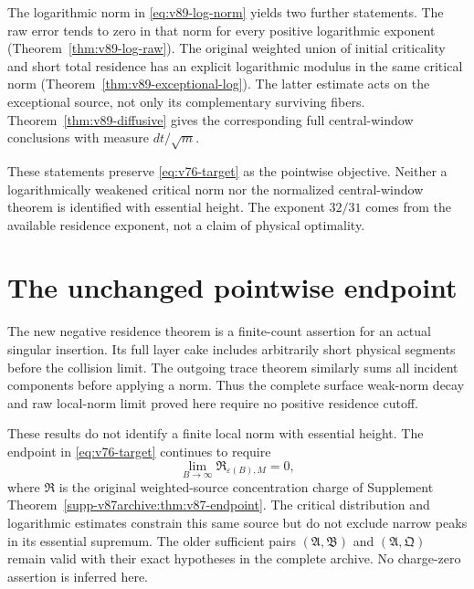 \documentclass[11pt,reqno]{amsart}
\numberwithin{equation}{section}
\theoremstyle{definition}\newtheorem{definition}[theorem]{Definition}
\theoremstyle{remark}\newtheorem{remark}[theorem]{Remark}
\theoremstyle{definition}\newtheorem{inputstatement}[theorem]{Input statement}
\begin{document}
The logarithmic norm in \eqref{eq:v89-log-norm} yields two further
statements. The raw error tends to zero in that norm for every
positive logarithmic exponent (Theorem~\ref{thm:v89-log-raw}).
The original weighted union of initial criticality and short total
residence has an explicit logarithmic modulus in the same critical
norm (Theorem~\ref{thm:v89-exceptional-log}). The latter estimate
acts on the exceptional source, not only its complementary surviving
fibers. Theorem~\ref{thm:v89-diffusive} gives the corresponding full
central-window conclusions with measure $dt/\sqrt m$.

These statements preserve \eqref{eq:v76-target} as the pointwise
objective. Neither a logarithmically weakened critical norm nor the
normalized central-window theorem is identified with essential height.
The exponent $32/31$ comes from the available residence exponent,
not a claim of physical optimality.











\section{The unchanged pointwise endpoint}
The new negative residence theorem is a finite-count assertion for an
actual singular insertion. Its full layer cake includes arbitrarily
short physical segments before the collision limit. The outgoing
trace theorem similarly sums all incident components before applying
a norm. Thus the complete surface weak-norm decay and raw local-norm
limit proved here require no positive residence cutoff.

These results do not identify a finite local norm with essential
height. The endpoint in \eqref{eq:v76-target} continues to require
\[
 \lim_{B\to\infty}\mathfrak R_{\varepsilon(B),M}=0,
\]
where $\mathfrak R$ is the original weighted-source concentration
charge of Supplement Theorem~\ref{supp-v87archive:thm:v87-endpoint}.
The critical distribution and logarithmic estimates constrain this same source but do not
exclude narrow peaks in its essential supremum. The older sufficient
pairs $(\mathfrak A,\mathfrak B)$ and $(\mathfrak A,\mathfrak Q)$
remain valid with their exact hypotheses in the complete archive.
No charge-zero assertion is inferred here.
\end{document}
